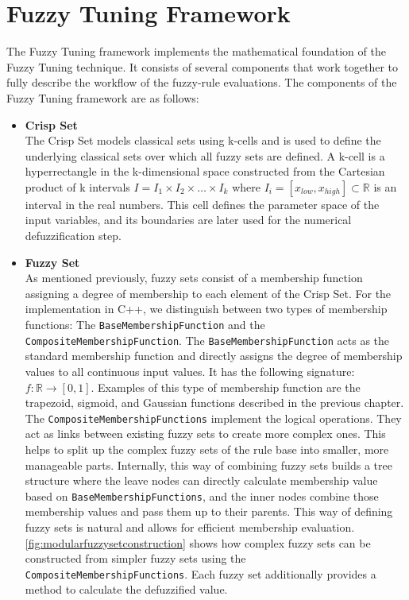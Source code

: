 \section{Fuzzy Tuning Framework}

The Fuzzy Tuning framework implements the mathematical foundation of the Fuzzy Tuning technique. It consists of several components that work together to fully describe the workflow of the fuzzy-rule evaluations. The components of the Fuzzy Tuning framework are as follows:

\begin{itemize}
  \item \textbf{Crisp Set}\\
        The Crisp Set models classical sets using k-cells and is used to define the underlying classical sets over which all fuzzy sets are defined. A k-cell is a hyperrectangle in the k-dimensional space constructed from the Cartesian product of k intervals $I = I_1 \times I_2 \times \ldots \times I_k$ where $I_i = [x_{low}, x_{high}] \subset \mathbb{R} $ is an interval in the real numbers. This cell defines the parameter space of the input variables, and its boundaries are later used for the numerical defuzzification step.


  \item \textbf{Fuzzy Set} \\
        As mentioned previously, fuzzy sets consist of a membership function assigning a degree of membership to each element of the Crisp Set. For the implementation in C++, we distinguish between two types of membership functions: The \texttt{BaseMembershipFunction} and the \texttt{CompositeMembershipFunction}. The \texttt{BaseMembershipFunction} acts as the standard membership function and directly assigns the degree of membership values to all continuous input values. It has the following signature: $f: \mathbb{R} \rightarrow [0, 1]$. Examples of this type of membership function are the trapezoid, sigmoid, and Gaussian functions described in the previous chapter. \\
        \smallskip
        The \texttt{CompositeMembershipFunctions} implement the logical operations. They act as links between existing fuzzy sets to create more complex ones. This helps to split up the complex fuzzy sets of the rule base into smaller, more manageable parts. Internally, this way of combining fuzzy sets builds a tree structure where the leave nodes can directly calculate membership value based on \texttt{BaseMembershipFunctions}, and the inner nodes combine those membership values and pass them up to their parents. This way of defining fuzzy sets is natural and allows for efficient membership evaluation. \autoref{fig:modularfuzzysetconstruction} shows how complex fuzzy sets can be constructed from simpler fuzzy sets using the \texttt{CompositeMembershipFunctions}. Each fuzzy set additionally provides a method to calculate the defuzzified value.


\end{itemize}
